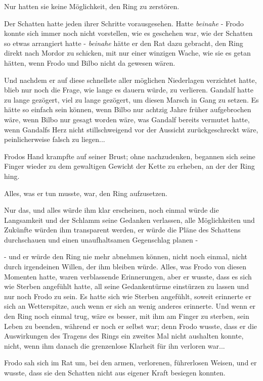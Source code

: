{Nur hatten sie keine Möglichkeit, den Ring zu zerstören.

Der Schatten hatte jeden ihrer Schritte vorausgesehen. Hatte \emph{beinahe} - Frodo konnte sich immer noch nicht vorstellen, wie es geschehen war, wie der Schatten so etwas arrangiert hatte - \emph{beinahe} hätte er den Rat dazu gebracht, den Ring direkt nach Mordor zu schicken, mit nur einer winzigen Wache, wie sie es getan hätten, wenn Frodo und Bilbo nicht da gewesen wären.

Und nachdem er auf diese schnellste aller möglichen Niederlagen verzichtet hatte, blieb nur noch die Frage, wie lange es dauern würde, zu verlieren. Gandalf hatte zu lange gezögert, viel zu lange gezögert, um diesen Marsch in Gang zu setzen. Es hätte so einfach sein können, wenn Bilbo nur achtzig Jahre früher aufgebrochen wäre, wenn Bilbo nur gesagt worden wäre, was Gandalf bereits vermutet hatte, wenn Gandalfs Herz nicht stillschweigend vor der Aussicht zurückgeschreckt wäre, peinlicherweise falsch zu liegen...

Frodos Hand krampfte auf seiner Brust; ohne nachzudenken, begannen sich seine Finger wieder zu dem gewaltigen Gewicht der Kette zu erheben, an der der Ring hing.

Alles, was er tun musste, war, den Ring aufzusetzen.

Nur das, und alles würde ihm klar erscheinen, noch einmal würde die Langsamkeit und der Schlamm seine Gedanken verlassen, alle Möglichkeiten und Zukünfte würden ihm transparent werden, er würde die Pläne des Schattens durchschauen und einen unaufhaltsamen Gegenschlag planen -

- und er würde den Ring nie mehr abnehmen können, nicht noch einmal, nicht durch irgendeinen Willen, der ihm bleiben würde. Alles, was Frodo von diesen Momenten hatte, waren verblassende Erinnerungen, aber er wusste, dass es sich wie Sterben angefühlt hatte, all seine Gedankentürme einstürzen zu lassen und nur noch Frodo zu sein. Es hatte sich wie Sterben angefühlt, soweit erinnerte er sich an Wetterspitze, auch wenn er sich an wenig anderes erinnerte. Und wenn er den Ring noch einmal trug, wäre es besser, mit ihm am Finger zu sterben, sein Leben zu beenden, während er noch er selbst war; denn Frodo wusste, dass er die Auswirkungen des Tragens des Rings ein zweites Mal nicht aushalten konnte, nicht, wenn ihm danach die grenzenlose Klarheit für ihn verloren war...

Frodo sah sich im Rat um, bei den armen, verlorenen, führerlosen Weisen, und er wusste, dass sie den Schatten nicht aus eigener Kraft besiegen konnten.

}
